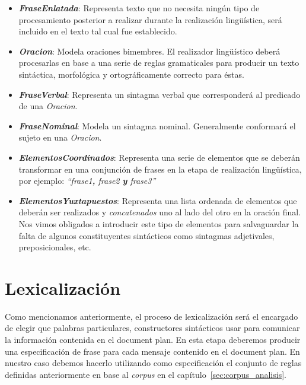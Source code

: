 \medskip
\begin{itemize}
\item{\emph{\textbf{FraseEnlatada}}: Representa texto que no necesita ningún tipo de procesamiento posterior a realizar durante la realización lingüística, será incluido en el texto tal cual fue establecido.}
\item{\emph{\textbf{Oracion}}: Modela oraciones bimembres. El realizador lingüístico deberá procesarlas en base a una serie de reglas gramaticales para producir un texto sintáctica, morfológica y ortográficamente correcto para éstas.}
\item{\emph{\textbf{FraseVerbal}}: Representa un sintagma verbal que corresponderá al predicado de una \emph{Oracion}.}
\item{\emph{\textbf{FraseNominal}}: Modela un sintagma nominal. Generalmente conformará el sujeto en una \emph{Oracion}.}
\item{\emph{\textbf{ElementosCoordinados}}: Representa una serie de elementos que se deberán transformar en una conjunción de frases en la etapa de realización lingüística, por ejemplo: \emph{``frase1\textbf{,} frase2 \textbf{y} frase3''}}
\item{\emph{\textbf{ElementosYuxtapuestos}}: Representa una lista ordenada de elementos que deberán ser realizados y \emph{concatenados} uno al lado del otro en la oración final. Nos vimos obligados a introducir este tipo de elementos para salvaguardar la falta de algunos constituyentes sintácticos como sintagmas adjetivales, preposicionales, etc.}
\end{itemize}



\section{Lexicalización}
\label{sec:microplanning_lexicalization}

Como mencionamos anteriormente, el proceso de lexicalización será el encargado de elegir que palabras particulares, constructores sintácticos usar para comunicar la información contenida en el document plan. En esta etapa deberemos producir una especificación de frase para cada mensaje contenido en el document plan. En nuestro caso debemos hacerlo utilizando como especificación el conjunto de reglas definidas anteriormente en base al \emph{corpus} en el capítulo~\ref{sec:corpus_analisis}.


